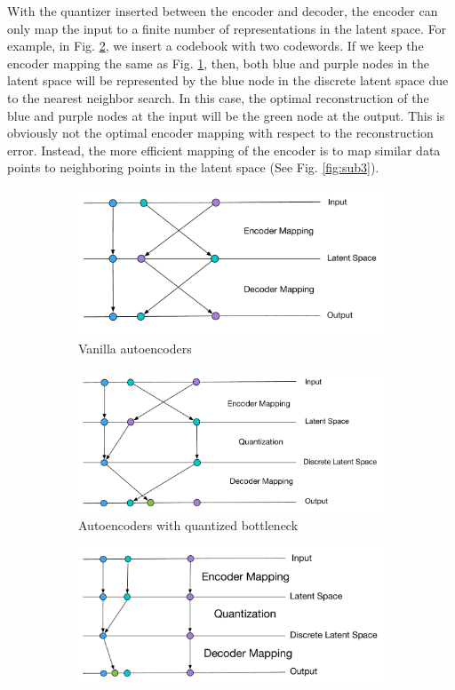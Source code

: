 \documentclass[letterpaper]{article} %
\begin{document}
With the quantizer inserted between the encoder and decoder, the encoder can only map the input to a finite number of representations in the latent space. For example, in Fig. \ref{fig: q2}, we insert a codebook with two codewords. If we keep the encoder mapping the same as Fig. \ref{fig: q1}, then, both blue and purple nodes in the latent space will be represented by the blue node in the discrete latent space due to the nearest neighbor search. In this case, the optimal reconstruction of the blue and purple nodes at the input will be the green node at the output. This is obviously not the optimal encoder mapping with respect to the reconstruction error. Instead, the more efficient mapping of the encoder is to map similar data points to neighboring points in the latent space (See Fig. \ref{fig:sub3}).
\begin{figure}[!ht]
\captionsetup[subfigure]{justification=centering}
\centering
\begin{subfigure}{.45\textwidth}
\centering
\includegraphics[width=.8\linewidth]{twolayer_original.pdf}
\caption{Vanilla autoencoders}
\label{fig: q1}
\end{subfigure}
\begin{subfigure}{.45\textwidth}
\centering
\includegraphics[width=.8\linewidth]{twolayer_noise.pdf}
\caption{Autoencoders with quantized bottleneck}
\label{fig: q2}
\end{subfigure}
\begin{subfigure}{.45\textwidth}
\centering
\includegraphics[width=.8\linewidth]{BetterMapping.pdf}

\end{subfigure}
\end{figure}
\end{document}
